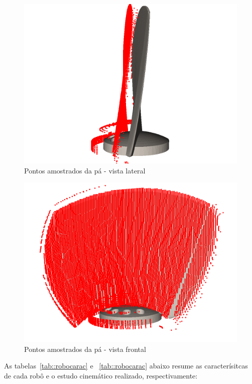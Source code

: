 \begin{figure}[h!]	
	\includegraphics[width=\columnwidth]{detail/figs/bighatch/amostrapa1.png}
	\caption{Pontos amostrados da pá - vista lateral}
	\label{fig::amostrapa1}
\end{figure}

\begin{figure}[h!]	
	\includegraphics[width=\columnwidth]{detail/figs/bighatch/amostrapa2.png}
	\caption{Pontos amostrados da pá - vista frontal}
	\label{fig::amostrapa2}
\end{figure}

As tabelas~\ref{tab::robocarac} e ~\ref{tab::robocarac} abaixo resume as
caracterísitcas de cada robô e o estudo cinemático realizado, respectivamente:

